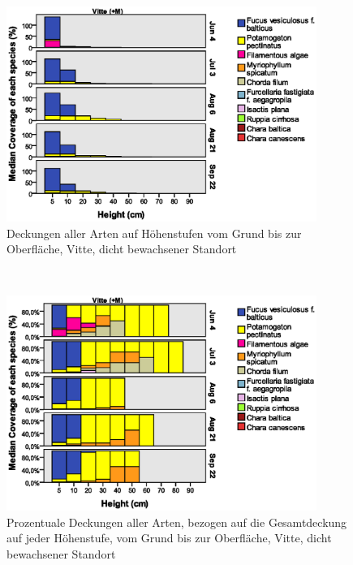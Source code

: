 \begin{figure}[!htb]
\centering
\includegraphics[width=0.90\textwidth]{images/Wuchshoehenkartierung/Vitte+Mb1.eps}
\caption[Höhenstufenkartierung Vitte (+M)]{Deckungen aller Arten auf Höhenstufen vom Grund bis zur Oberfläche, Vitte, dicht bewachsener Standort}
\label{fig:wuchshoehen_vitte_+m1}
\end{figure}
\\
\begin{figure}[!htb]
\centering
\includegraphics[width=0.90\textwidth]{images/Wuchshoehenkartierung/Vitte+Mb2.eps}
\caption[prozentuale Höhenstufenkartierung Vitte (+M)]{Prozentuale Deckungen aller Arten, bezogen auf die Gesamtdeckung auf jeder Höhenstufe, vom Grund bis zur Oberfläche, Vitte, dicht bewachsener Standort}
\label{fig:wuchshoehen_vitte_+m2}
\end{figure}

\FloatBarrier

